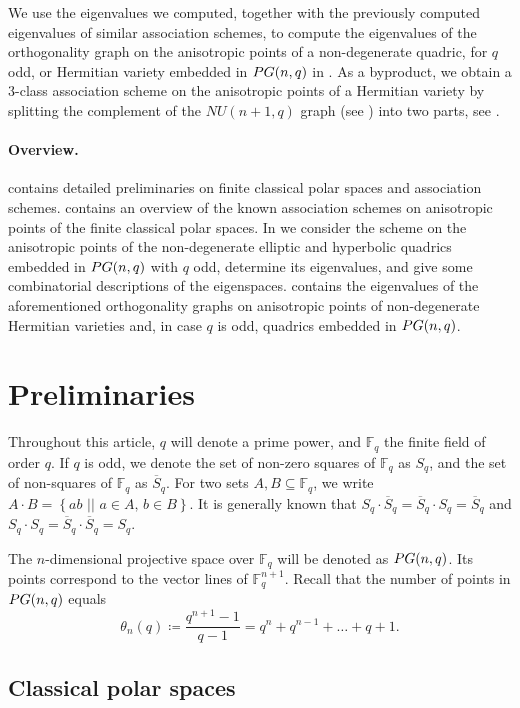 \documentclass[a4paper]{article}
\theoremstyle{definition}
\newcommand{\FF}{\mathbb F}
\newcommand{\sett}[2]{ \left\{ #1 \, \, || \, \, #2 \right \} }
\newcommand{\pg}{\textnormal{PG}}
\newcommand{\ns}{\overline S}
\begin{document}
We use the eigenvalues we computed, together with the previously computed eigenvalues of similar association schemes, to compute the eigenvalues of the orthogonality graph on the anisotropic points of a non-degenerate quadric, for $q$ odd, or Hermitian variety embedded in $\pg(n,q)$ in .
As a byproduct, we obtain a 3-class association scheme on the anisotropic points of a Hermitian variety by splitting the complement of the $NU(n+1,q)$ graph (see \cite[\S 3.1.6]{bcn}) into two parts, see .

\paragraph{Overview.}  contains detailed preliminaries on finite classical polar spaces and association schemes.
 contains an overview of the known association schemes on anisotropic points of the finite classical polar spaces.
In  we consider the scheme on the anisotropic points of the non-degenerate elliptic and hyperbolic quadrics embedded in $\pg(n,q)$ with $q$ odd, determine its eigenvalues, and give some combinatorial descriptions of the eigenspaces.
 contains the eigenvalues of the aforementioned orthogonality graphs on anisotropic points of non-degenerate Hermitian varieties and, in case $q$ is odd, quadrics embedded in $\pg(n,q)$.



\section{Preliminaries}
 \label{Sec:Prel}

Throughout this article, $q$ will denote a prime power, and $\FF_q$ the finite field of order $q$.
If $q$ is odd, we denote the set of non-zero squares of $\FF_q$ as $S_q$, and the set of non-squares of $\FF_q$ as $\ns_q$.
For two sets $A,B \subseteq \FF_q$, we write $A \cdot B = \sett{ab}{a \in A, \, b \in B}$. %
It is generally known that $S_q \cdot \ns_q = \ns_q \cdot S_q = \ns_q$ and $S_q \cdot S_q = \ns_q \cdot \ns_q = S_q$.

The $n$-dimensional projective space over $\FF_q$ will be denoted as $\pg(n,q)$.
Its points correspond to the vector lines of $\FF^{n+1}_q$.
Recall that the number of points in $\pg(n,q)$ equals
\[
 \theta_n(q) \coloneqq \frac{q^{n+1}-1}{q-1} = q^n + q^{n-1} + \ldots + q + 1.
\]

\subsection{Classical polar spaces}
\end{document}
